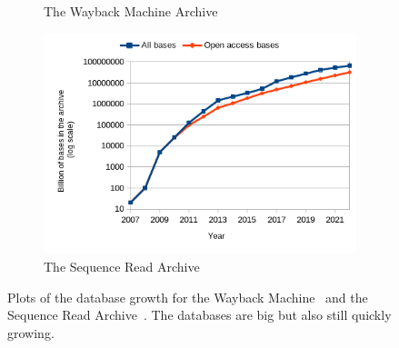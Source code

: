 \begin{figure}
    \centering
    \begin{subfigure}[b]{0.45\textwidth}
        \caption{The Wayback Machine Archive}
    \end{subfigure}
    \begin{subfigure}[b]{0.49\textwidth}
    \includegraphics[width=\textwidth]{0_sheets/sra_growth.png}
    \caption{The Sequence Read Archive}
\end{subfigure}
\caption{Plots of the database growth for the Wayback Machine~\cite{web-archive-growth} and the Sequence Read Archive~\cite{sra}. The databases are big but also still quickly growing.}
\label{fig:scalability}
\end{figure}
